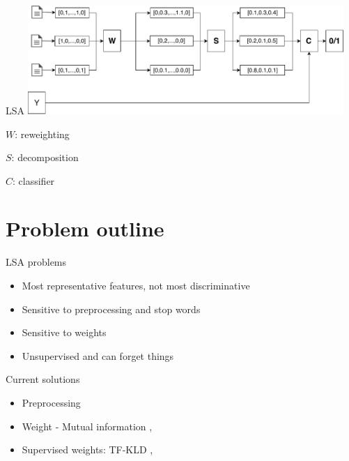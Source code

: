 \documentclass[xcolor={table}]{beamer}
\begin{document}
\begin{frame}{LSA}
    \includegraphics[width=0.9\textwidth]{LSA.pdf}
    \begin{block}
        
        $W$: reweighting

        $S$: decomposition
        
        $C$: classifier
    \end{block}
\end{frame}


\section{Problem outline}
\begin{frame}{LSA problems}
    \begin{block}{}
        \begin{itemize}
            \item Most representative features, not most discriminative
            \item Sensitive to preprocessing and stop words
            \item Sensitive to weights
            \item Unsupervised and can forget things
        \end{itemize}
    \end{block}
\end{frame} 

\begin{frame}{Current solutions}
    \begin{block}{}
        \begin{itemize}
            \item Preprocessing
            \item Weight - Mutual information \cite{wu2017balancing}, \cite{deng2014study}
            \item Supervised weights: TF-KLD \cite{ji2013discriminative}, \cite{lan2009supervised}
        \end{itemize}
    \end{block}
\end{frame} 
\end{document}

